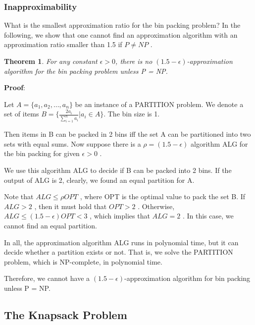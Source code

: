 \documentclass{article}
\newtheorem*{Theorem}{Theorem}
\begin{document}
\subsubsection{Inapproximability}
What is the smallest approximation ratio for the bin packing problem? In the following, we show that one cannot find an approximation algorithm with an approximation ratio smaller than 1.5 if $P \neq NP$ .\par

\begin{Theorem}
    For any constant $\epsilon > 0$, there is no $(1.5 - \epsilon)$-approximation algorithm for the bin packing problem unless P = NP.
\end{Theorem}

\textbf{Proof}:\par
Let $A = \{a_1, a_2, \dots , a_n\}$ be an instance of a PARTITION problem. We denote a set of items $B = \{\frac{2a_i}{\sum\limits_{i=1}^n a_i} | a_i \in A\}$. The bin size is 1.\par
Then items in B can be packed in 2 bins iff the set A can be partitioned into two sets with equal sums. Now suppose there is a $\rho = (1.5 - \epsilon )$ algorithm ALG for the bin packing for given $\epsilon > 0$ .\par
We use this algorithm ALG to decide if B can be packed into 2 bins. If the output of ALG is 2, clearly, we found an equal partition for A.\par
Note that $ALG \le \rho OPT$ , where OPT is the optimal value to pack the set B. If $ALG > 2$ , then it must hold that $OPT > 2$ . Otherwise, $ALG \le (1.5 - \epsilon )OPT < 3$ , which implies that $ALG = 2$ . In this case, we cannot find an equal partition.\par
In all, the approximation algorithm ALG runs in polynomial time, but it can decide whether a partition exists or not. That is, we solve the PARTITION problem, which is NP-complete, in polynomial time.\par
Therefore, we cannot have a $(1.5 - \epsilon )$-approximation algorithm for bin packing unless P = NP.

\subsection{The Knapsack Problem}
\end{document}
